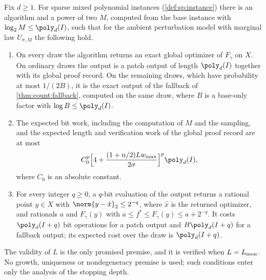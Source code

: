 \begin{theorem}\label{thm:sp:main}
Fix $d\ge1$. For sparse mixed polynomial instances
(\cref{def:sp:instance}) there is an algorithm and a power of two $M$,
computed from the base instance with $\log_2M\le\poly_d(I)$, such that for
the ambient perturbation model with marginal law $U_{\sigma,M}$ the
following hold.
\begin{enumerate}[label=(\roman*)]
\item\label{it:sp:exact} On every draw the algorithm returns an exact global
optimizer of $F_\gamma$ on $X$. On ordinary draws the output is a patch
output of length $\poly_d(I)$ together with its global proof record. On the
remaining draws, which have probability at most $1/(2B)$, it is the exact
output of the fallback of \cref{thm:count:fallback}, computed on the same
draw, where $B$ is a base-only factor with $\log B\le\poly_d(I)$.
\item\label{it:sp:work} The expected bit work, including the computation of
$M$ and the sampling, and the expected length and verification work of the
global proof record are at most
\begin{equation}\label{eq:sp:bound}
 C_0^p\Bigl[4+\frac{(1+n/2)Lw_{\max}}{2\sigma}\Bigr]^p\poly_d(I),
\end{equation}
where $C_0$ is an absolute constant.
\item\label{it:sp:eval} For every integer $q\ge0$, a $q$-bit evaluation of
the output returns a rational point $y\in X$ with
$\norm{y-\hat x}_2\le2^{-q}$, where $\hat x$ is the returned optimizer, and
rationals $a$ and $F_\gamma(y)$ with $a\le f^*\le F_\gamma(y)\le a+2^{-q}$.
It costs $\poly_d(I+q)$ bit operations for a patch output and
$B\poly_d(I+q)$ for a fallback output; its expected cost over the draw is
$\poly_d(I+q)$.
\end{enumerate}
The validity of $L$ is the only promised premise, and it is verified when
$L=L_{\rm mon}$. No growth, uniqueness or nondegeneracy premise is used; such
conditions enter only the analysis of the stopping depth.
\end{theorem}

